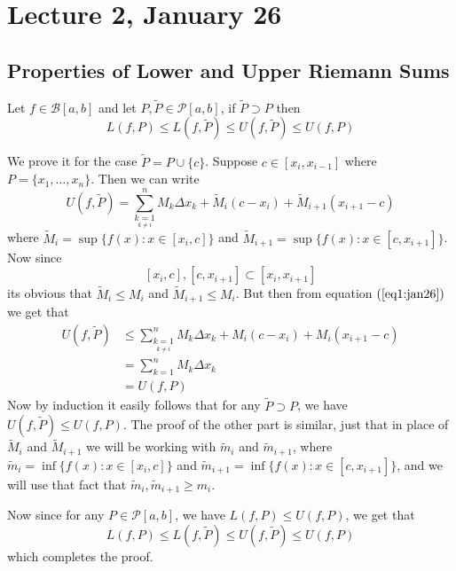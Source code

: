 \chapter*{Lecture 2, January 26}
\setcounter{chapter}{2}

\section{Properties of Lower and Upper Riemann Sums}

\begin{props}\label{prop1:jan26}
    Let $f \in \mathcal{B}[a,b]$ and let $P, \tilde{P} \in \mathcal{P}[a,b]$, if $\tilde{P} \supset P$ then \[ L(f,P) \leq L(f,\tilde{P}) \leq U(f,\tilde{P}) \leq U(f,P)\]
\end{props}
\begin{prf}
    We prove it for the case $\tilde{P} = P \cup \{c\}$. Suppose $c \in [x_i, x_{i-1}]$ where $P = \{x_1,\dots,x_n\}$. Then we can write 
    \begin{equation}\label{eq1:jan26}
        U(f,\tilde{P}) = \sum_{\underset{k \neq i}{k=1}}^n M_k \Delta x_k + \tilde{M}_i(c-x_i)+\tilde{M}_{i+1}(x_{i+1}-c) 
    \end{equation}
    where $\tilde{M}_i = \sup \{f(x) : x\in [x_i,c]\}$ and $\tilde{M}_{i+1} = \sup \{f(x) : x \in [c,x_{i+1}]\}$. Now since \[[x_i,c], [c,x_{i+1}] \subset [x_i,x_{i+1}]\] its obvious that $\tilde{M}_i \leq M_i$ and $\tilde{M}_{i+1} \leq M_i$. But then from equation $(\ref{eq1:jan26})$ we get that 
    \begin{align*}
        U(f,\tilde{P}) &\leq \sum_{\underset{k \neq i}{k=1}}^n M_k \Delta x_k + M_i(c-x_i)+M_i(x_{i+1}-c) \\ &= \sum_{k=1}^n M_k \Delta x_k \\ &= U(f,P) 
    \end{align*}
    Now by induction it easily follows that for any $\tilde{P} \supset P$, we have $U(f,\tilde{P}) \leq U(f,P)$. The proof of the other part is similar, just that in place of $\tilde{M}_i$ and $\tilde{M}_{i+1}$ we will be working with $\tilde{m}_i$ and $\tilde{m}_{i+1}$, where $\tilde{m}_i = \inf \{f(x) : x \in [x_i,c]\}$ and $\tilde{m}_{i+1} = \inf \{ f(x) : x \in [c,x_{i+1}] \}$, and we will use that fact that $\tilde{m}_i, \tilde{m}_{i+1} \geq m_i$. 

    Now since for any $ P \in \mathcal{P}[a,b]$, we have $L(f,P) \leq U(f,P)$, we get that 
    \[ L(f,P) \leq L(f,\tilde{P}) \leq U(f,\tilde{P}) \leq U(f,P) \]
    which completes the proof.
\end{prf}

